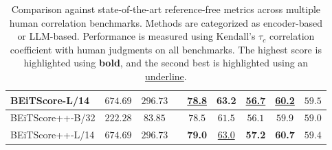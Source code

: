 \begin{table}[t]
{\begin{tabular}{l c c c c c c c c}
BEiTScore-L/14                & $674.69$ & $296.73$ & & \underline{78.8} & \textbf{63.2} & \underline{56.7} & \underline{60.2} & $59.5$  \\
\midrule
BEiTScore++-B/32                & $222.28$ & $83.85$ & & $78.5$ & $61.5$ & $56.1$ & $59.9$ & $59.0$  \\
BEiTScore++-L/14                & $674.69$ & $296.73$ & & \textbf{79.0} & \underline{63.0} & \textbf{57.2} & \textbf{60.7} & $59.4$  \\
\bottomrule
\end{tabular}}
\vspace{-0.12cm}
\caption{Comparison against state-of-the-art reference-free metrics across multiple human correlation benchmarks. Methods are categorized as encoder-based or LLM-based. Performance is measured using Kendall’s $\tau_c$ correlation coefficient with human judgments on all benchmarks. The highest score is highlighted using \textbf{bold}, and the second best is highlighted using an \underline{underline}.}
\vspace{-0.12cm}
\label{tab:human_corr}
\end{table}